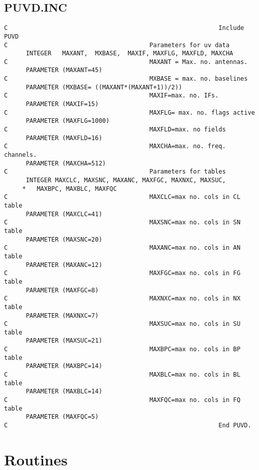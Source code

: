 \subsection{PUVD.INC}
\begin{verbatim}
C                                                          Include PUVD
C                                       Parameters for uv data
      INTEGER   MAXANT,  MXBASE,  MAXIF, MAXFLG, MAXFLD, MAXCHA
C                                       MAXANT = Max. no. antennas.
      PARAMETER (MAXANT=45)
C                                       MXBASE = max. no. baselines
      PARAMETER (MXBASE= ((MAXANT*(MAXANT+1))/2))
C                                       MAXIF=max. no. IFs.
      PARAMETER (MAXIF=15)
C                                       MAXFLG= max. no. flags active
      PARAMETER (MAXFLG=1000)
C                                       MAXFLD=max. no fields
      PARAMETER (MAXFLD=16)
C                                       MAXCHA=max. no. freq. channels.
      PARAMETER (MAXCHA=512)
C                                       Parameters for tables
      INTEGER MAXCLC, MAXSNC, MAXANC, MAXFGC, MAXNXC, MAXSUC,
     *   MAXBPC, MAXBLC, MAXFQC
C                                       MAXCLC=max no. cols in CL table
      PARAMETER (MAXCLC=41)
C                                       MAXSNC=max no. cols in SN table
      PARAMETER (MAXSNC=20)
C                                       MAXANC=max no. cols in AN table
      PARAMETER (MAXANC=12)
C                                       MAXFGC=max no. cols in FG table
      PARAMETER (MAXFGC=8)
C                                       MAXNXC=max no. cols in NX table
      PARAMETER (MAXNXC=7)
C                                       MAXSUC=max no. cols in SU table
      PARAMETER (MAXSUC=21)
C                                       MAXBPC=max no. cols in BP table
      PARAMETER (MAXBPC=14)
C                                       MAXBLC=max no. cols in BL table
      PARAMETER (MAXBLC=14)
C                                       MAXFQC=max no. cols in FQ table
      PARAMETER (MAXFQC=5)
C                                                          End PUVD.
\end{verbatim}

\section{Routines }

